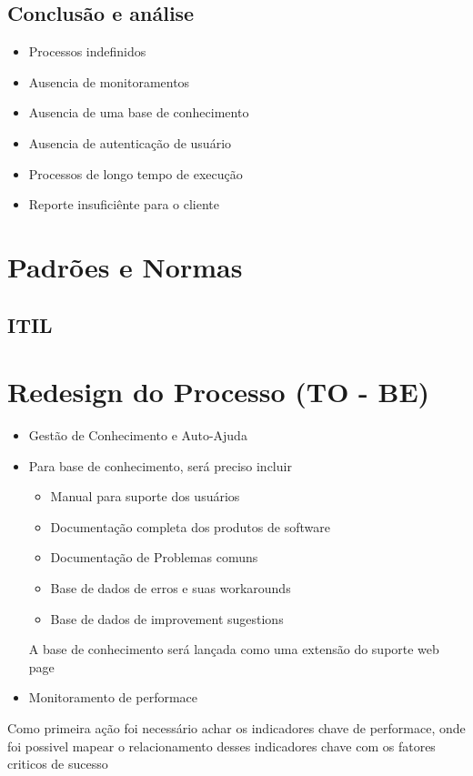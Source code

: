 \documentclass[11pt,a4paper]{article}
\begin{document}
\subsection{Conclusão e análise}
\begin{itemize}[noitemsep]
  \item Processos indefinidos
  \item Ausencia de monitoramentos
  \item Ausencia de uma base de conhecimento
  \item Ausencia de autenticação de usuário
  \item Processos de longo tempo de execução
  \item Reporte insuficiênte para o cliente
\end{itemize}

\section{Padrões e Normas}
\subsection{ITIL}

\section{Redesign do Processo (TO - BE)}

\begin{itemize}[noitemsep]
	\item Gestão de Conhecimento e Auto-Ajuda
	\item	Para base de conhecimento, será preciso incluir
	\begin{itemize}[noitemsep]
		\item Manual para suporte dos usuários
		\item Documentação completa dos produtos de software
		\item Documentação de Problemas comuns
		\item Base de dados de erros e suas workarounds
		\item Base de dados de improvement sugestions
	\end{itemize}
	A base de conhecimento será lançada como uma extensão do
	suporte web page
	\item Monitoramento de performace
\end{itemize}


Como primeira ação foi necessário achar os indicadores chave de performace,
onde foi possivel mapear o relacionamento desses indicadores chave com os fatores
criticos de sucesso
\end{document}
